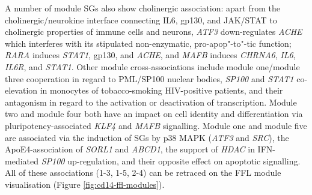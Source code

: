 A number of module SGs also show cholinergic association: apart from the cholinergic/neurokine interface connecting IL6, gp130, and JAK/STAT to cholinergic properties of immune cells and neurons,\cite{Lobentanzer2019a} \emph{ATF3} down-regulates \emph{ACHE} which interferes with its stipulated non-enzymatic, pro-apop"-to"-tic function; \emph{RARA} induces \emph{STAT1}, gp130, and \emph{ACHE}, and \emph{MAFB} induces \emph{CHRNA6}, \emph{IL6}, \emph{IL6R}, and \emph{STAT1}. Other module cross-associations include module one/module three cooperation in regard to PML/SP100 nuclear bodies, \emph{SP100} and \emph{STAT1} co-elevation in monocytes of tobacco-smoking HIV-positive patients, and their antagonism in regard to the activation or deactivation of transcription. Module two and module four both have an impact on cell identity and differentiation via pluripotency-associated \emph{KLF4} and \emph{MAFB} signalling. Module one and module five are associated via the induction of SGs by p38 MAPK (\emph{ATF3} and \emph{SRC}), the ApoE4-association of \emph{SORL1} and \emph{ABCD1}, the support of \emph{HDAC} in IFN-mediated \emph{SP100} up-regulation, and their opposite effect on apoptotic signalling. All of these associations (1-3, 1-5, 2-4) can be retraced on the FFL module visualisation (Figure \ref{fig:cd14-ffl-modules}).




